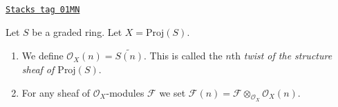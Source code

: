 \begin{definition}[Twist]
\label{constructions-definition-twist}
\href{https://stacks.math.columbia.edu/tag/01MN}{\texttt{Stacks tag 01MN}}

Let $S$ be a graded ring. Let $X = \text{Proj}(S)$.
\begin{enumerate}
\item We define $\mathcal{O}_X(n) = \widetilde{S(n)}$.
This is called the $n$th
{\it twist of the structure sheaf of $\text{Proj}(S)$}.
\item For any sheaf of $\mathcal{O}_X$-modules $\mathcal{F}$ we set
$\mathcal{F}(n) = \mathcal{F} \otimes_{\mathcal{O}_X} \mathcal{O}_X(n)$.
\end{enumerate}
\end{definition}

